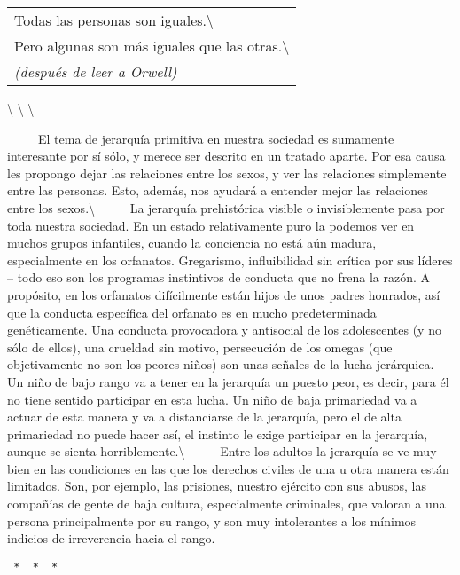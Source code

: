 \begin{longtable}[]{@{}l@{}}
\toprule
Todas las personas son iguales.\textbackslash{}\tabularnewline
Pero algunas son más iguales que las
otras.\textbackslash{}\tabularnewline
\emph{(después de leer a Orwell)}\tabularnewline
\bottomrule
\end{longtable}

\textbackslash{} \textbackslash{} \textbackslash{}

~ ~ ~ El tema de jerarquía primitiva en nuestra sociedad es sumamente
interesante por sí sólo, y merece ser descrito en un tratado aparte. Por
esa causa les propongo dejar las relaciones entre los sexos, y ver las
relaciones simplemente entre las personas. Esto, además, nos ayudará a
entender mejor las relaciones entre los sexos.\textbackslash{} ~ ~ ~ La
jerarquía prehistórica visible o invisiblemente pasa por toda nuestra
sociedad. En un estado relativamente puro la podemos ver en muchos
grupos infantiles, cuando la conciencia no está aún madura,
especialmente en los orfanatos. Gregarismo, influibilidad sin crítica
por sus líderes -- todo eso son los programas instintivos de conducta
que no frena la razón. A propósito, en los orfanatos difícilmente están
hijos de unos padres honrados, así que la conducta específica del
orfanato es en mucho predeterminada genéticamente. Una conducta
provocadora y antisocial de los adolescentes (y no sólo de ellos), una
crueldad sin motivo, persecución de los omegas (que objetivamente no son
los peores niños) son unas señales de la lucha jerárquica. Un niño de
bajo rango va a tener en la jerarquía un puesto peor, es decir, para él
no tiene sentido participar en esta lucha. Un niño de baja primariedad
va a actuar de esta manera y va a distanciarse de la jerarquía, pero el
de alta primariedad no puede hacer así, el instinto le exige participar
en la jerarquía, aunque se sienta horriblemente.\textbackslash{} ~ ~ ~
Entre los adultos la jerarquía se ve muy bien en las condiciones en las
que los derechos civiles de una u otra manera están limitados. Son, por
ejemplo, las prisiones, nuestro ejército con sus abusos, las compañías
de gente de baja cultura, especialmente criminales, que valoran a una
persona principalmente por su rango, y son muy intolerantes a los
mínimos indicios de irreverencia hacia el rango.

\begin{verbatim}
 *  *  * 
\end{verbatim}

